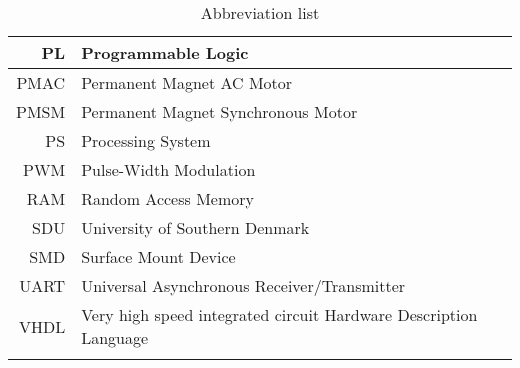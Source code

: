 \begin{table}[H]
\begin{tabular}{|r|l|}
PL           & Programmable Logic                                               \\ \hline
PMAC         & Permanent Magnet AC Motor                                        \\ \hline
PMSM         & Permanent Magnet Synchronous Motor                               \\ \hline
PS           & Processing System                                                \\ \hline
PWM          & Pulse-Width Modulation                                           \\ \hline
RAM          & Random Access Memory                                             \\ \hline
SDU          & University of Southern Denmark                                   \\ \hline
SMD          & Surface Mount Device                                             \\ \hline
UART         & Universal Asynchronous Receiver/Transmitter                      \\ \hline
VHDL         & Very high speed integrated circuit Hardware Description Language \\ \hline
             &                                                                  \\ \hline
\end{tabular}
\caption{Abbreviation list}\label{Abbreviationlist}
\label{tab:variable_ids}
\end{table}

